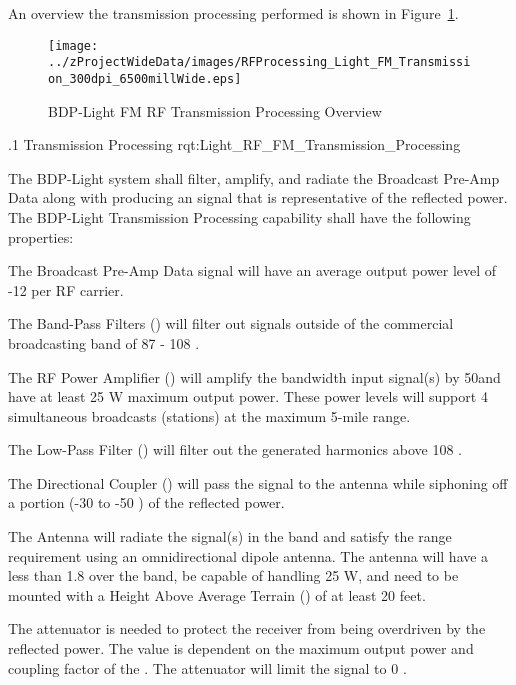 An overview the \FM \RF transmission processing performed is shown in Figure~\ref{fig:Light_RF_Processing_FM_Transmission}.
\newpage
\begin{figure}[htbp]
	\centering
		\texttt{[image: ../zProjectWideData/images/RFProcessing\_Light\_FM\_Transmission\_300dpi\_6500millWide.eps]}
	\caption[BDP-Light FM RF Transmission Processing Overview]{BDP-Light FM RF Transmission Processing Overview}
	\label{fig:Light_RF_Processing_FM_Transmission}
\end{figure}

\ONERQMTV
{\RqtNumberBase.1}
{\ThisSubSegment Transmission Processing}
{rqt:Light_RF_FM_Transmission_Processing}
{
The BDP-Light system shall filter, amplify, and radiate the \FM \RF Broadcast Pre-Amp Data along with producing an \RF signal that is representative of the reflected \RF power. The BDP-Light \FM \RF Transmission Processing capability shall have the following properties:
\begin{my_enumerate}
	\item The \FM \RF Broadcast Pre-Amp Data signal will have an average output power level of -12 \dBm per RF carrier.
	\item The Band-Pass Filters (\BPF) will filter out signals outside of the commercial \FM broadcasting band of 87 - 108 \MHz.
	\item The RF Power Amplifier (\PA) will amplify the \FM bandwidth input signal(s) by 50\dB and have at least 25 W maximum output power. These power levels will support 4 simultaneous \FM broadcasts (\FM stations) at the maximum 5-mile range.
	\item The Low-Pass Filter (\LPF) will filter out the generated harmonics above 108 \MHz.
	\item The Directional Coupler (\DC) will pass the \RF signal to the antenna while siphoning off a portion (-30 to -50 \dB) of the reflected power.
	\item The Antenna will radiate the \RF signal(s) in the \FM band and satisfy the range requirement using an omnidirectional dipole antenna. The antenna will have a \VSWR less than 1.8 over the \FM band, be capable of handling 25 W, and need to be mounted with a Height Above Average Terrain (\HAAT) of at least 20 feet.
	\item The attenuator is needed to protect the receiver from being overdriven by the reflected power. The value is dependent on the maximum \PA output power and coupling factor of the \DC. The attenuator will limit the signal to 0 \dBm.
\end{my_enumerate}
}
